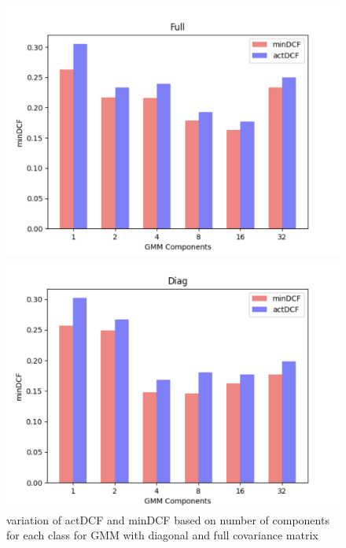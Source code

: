 \documentclass{article}
\begin{document}
\begin{figure}[H]
    \centering
    \begin{minipage}{.3\textwidth}
        \centering
        \includegraphics[width=\linewidth]{./img/GMM_Full.png}    
    \end{minipage}%
    \begin{minipage}{.3\textwidth}
        \centering
        \includegraphics[width=\linewidth]{./img/GMM_diag.png}
    \end{minipage}
    \caption{variation of actDCF and minDCF based on number of components for each class for GMM with diagonal and full covariance matrix} %
    \label{fig:GMM_hist} 
\end{figure}
\end{document}
